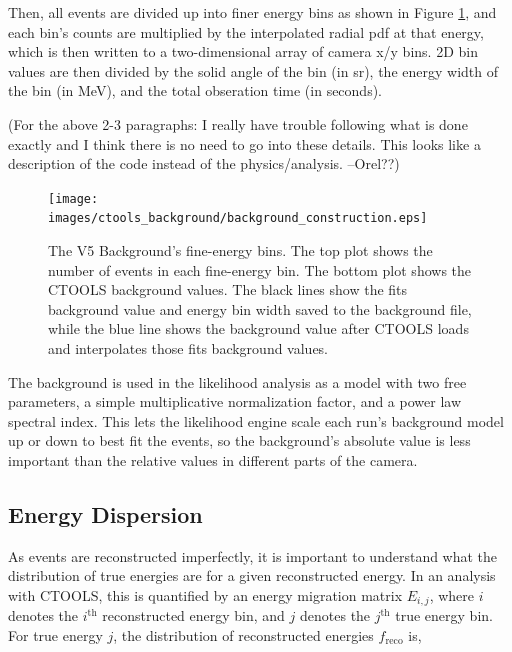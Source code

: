     Then, all events are divided up into  finer energy bins as shown in Figure \ref{fig:background_profile}, and each bin's counts are multiplied by the interpolated radial pdf at that energy, which is then written to a two-dimensional array of camera x/y bins.
    2D bin values are then divided by the solid angle of the bin (in sr), the energy width of the bin (in MeV), and the total obseration time (in seconds).

    (For the above 2-3 paragraphs: I really have trouble following what is done exactly and I think there is no need to go into these details. This looks like a description of the code instead of the physics/analysis. --Orel??)

    \begin{figure}[ht]
      \centering
      \texttt{[image: images/ctools\_background/background\_construction.eps]}
      \caption[CTOOLS Background Fine Energy Bins]{
        The V5 Background's fine-energy bins.
        The top plot shows the number of events in each fine-energy bin.
        The bottom plot shows the CTOOLS background values.
        The black lines show the fits background value and energy bin width saved to the background file, while the blue line shows the background value after CTOOLS loads and interpolates those fits background values.
      }
      \label{fig:background_profile}
    \end{figure}

    The background is used in the likelihood analysis as a model with two free parameters, a simple multiplicative normalization factor, and a power law spectral index.
    This lets the likelihood engine scale each run's background model up or down to best fit the events, so the background's absolute value is less important than the relative values in different parts of the camera.

  \subsection{Energy Dispersion}\label{subsec:edisp}
    As events are reconstructed imperfectly, it is important to understand what the distribution of true energies are for a given reconstructed energy.
    In an analysis with CTOOLS, this is quantified by an energy migration matrix $E_{i,j}$, where $i$ denotes the $i^{\text{th}}$ reconstructed energy bin, and $j$ denotes the $j^{\text{th}}$ true energy bin.
    For true energy $j$, the distribution of reconstructed energies $f_{\text{reco}}$ is,

